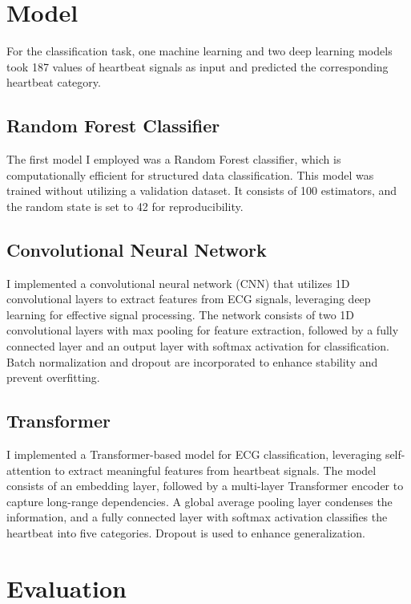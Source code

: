 \documentclass[11pt,a4paper,twoside]{article}
\begin{document}
\section{Model}
For the classification task, one machine learning and two deep learning models took 187 values of heartbeat signals as input and predicted the corresponding heartbeat category.

\subsection{Random Forest Classifier}
The first model I employed was a Random Forest classifier, which is computationally efficient for structured data classification. This model was trained without utilizing a validation dataset. It consists of 100 estimators, and the random state is set to 42 for reproducibility.

\subsection{Convolutional Neural Network}
I implemented a convolutional neural network (CNN) that utilizes 1D convolutional layers to extract features from ECG signals, leveraging deep learning for effective signal processing. The network consists of two 1D convolutional layers with max pooling for feature extraction, followed by a fully connected layer and an output layer with softmax activation for classification. Batch normalization and dropout are incorporated to enhance stability and prevent overfitting.

\subsection{Transformer}
I implemented a Transformer-based model for ECG classification, leveraging self-attention to extract meaningful features from heartbeat signals. The model consists of an embedding layer, followed by a multi-layer Transformer encoder to capture long-range dependencies. A global average pooling layer condenses the information, and a fully connected layer with softmax activation classifies the heartbeat into five categories. Dropout is used to enhance generalization.


\section{Evaluation}
\end{document}
